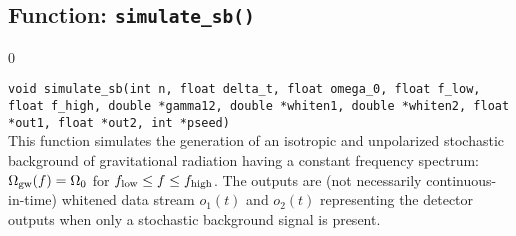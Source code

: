 \subsection{Function: {\tt simulate\_sb()}}
\label{subsec:simulate_sb}
\setcounter{equation}0

{\tt void simulate\_sb(int n, float delta\_t, float omega\_0, float f\_low,
float f\_high, double *gamma12, double *whiten1, double *whiten2, 
float *out1, float *out2, int *pseed)}\\
%
This function simulates the generation of an isotropic and unpolarized
stochastic background of gravitational radiation having a constant 
frequency spectrum: 
$\Omega_{\rm gw}(f)=\Omega_0$ for $f_{\rm low}\le f \le f_{\rm high}$.
The outputs are (not necessarily continuous-in-time)
whitened data stream $o_1(t)$ and $o_2(t)$ representing the detector 
outputs when only a stochastic background signal is present.

